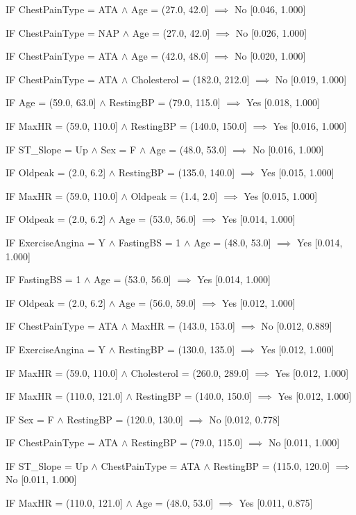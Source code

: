 IF ChestPainType = ATA $\land$ Age = (27.0, 42.0] $\implies$ No [0.046, 1.000]

IF ChestPainType = NAP $\land$ Age = (27.0, 42.0] $\implies$ No [0.026, 1.000]

IF ChestPainType = ATA $\land$ Age = (42.0, 48.0] $\implies$ No [0.020, 1.000]

IF ChestPainType = ATA $\land$ Cholesterol = (182.0, 212.0] $\implies$ No [0.019, 1.000]

IF Age = (59.0, 63.0] $\land$ RestingBP = (79.0, 115.0] $\implies$ Yes [0.018, 1.000]

IF MaxHR = (59.0, 110.0] $\land$ RestingBP = (140.0, 150.0] $\implies$ Yes [0.016, 1.000]

IF ST_Slope = Up $\land$ Sex = F $\land$ Age = (48.0, 53.0] $\implies$ No [0.016, 1.000]

IF Oldpeak = (2.0, 6.2] $\land$ RestingBP = (135.0, 140.0] $\implies$ Yes [0.015, 1.000]

IF MaxHR = (59.0, 110.0] $\land$ Oldpeak = (1.4, 2.0] $\implies$ Yes [0.015, 1.000]

IF Oldpeak = (2.0, 6.2] $\land$ Age = (53.0, 56.0] $\implies$ Yes [0.014, 1.000]

IF ExerciseAngina = Y $\land$ FastingBS = 1 $\land$ Age = (48.0, 53.0] $\implies$ Yes [0.014, 1.000]

IF FastingBS = 1 $\land$ Age = (53.0, 56.0] $\implies$ Yes [0.014, 1.000]

IF Oldpeak = (2.0, 6.2] $\land$ Age = (56.0, 59.0] $\implies$ Yes [0.012, 1.000]

IF ChestPainType = ATA $\land$ MaxHR = (143.0, 153.0] $\implies$ No [0.012, 0.889]

IF ExerciseAngina = Y $\land$ RestingBP = (130.0, 135.0] $\implies$ Yes [0.012, 1.000]

IF MaxHR = (59.0, 110.0] $\land$ Cholesterol = (260.0, 289.0] $\implies$ Yes [0.012, 1.000]

IF MaxHR = (110.0, 121.0] $\land$ RestingBP = (140.0, 150.0] $\implies$ Yes [0.012, 1.000]

IF Sex = F $\land$ RestingBP = (120.0, 130.0] $\implies$ No [0.012, 0.778]

IF ChestPainType = ATA $\land$ RestingBP = (79.0, 115.0] $\implies$ No [0.011, 1.000]

IF ST_Slope = Up $\land$ ChestPainType = ATA $\land$ RestingBP = (115.0, 120.0] $\implies$ No [0.011, 1.000]

IF MaxHR = (110.0, 121.0] $\land$ Age = (48.0, 53.0] $\implies$ Yes [0.011, 0.875]

